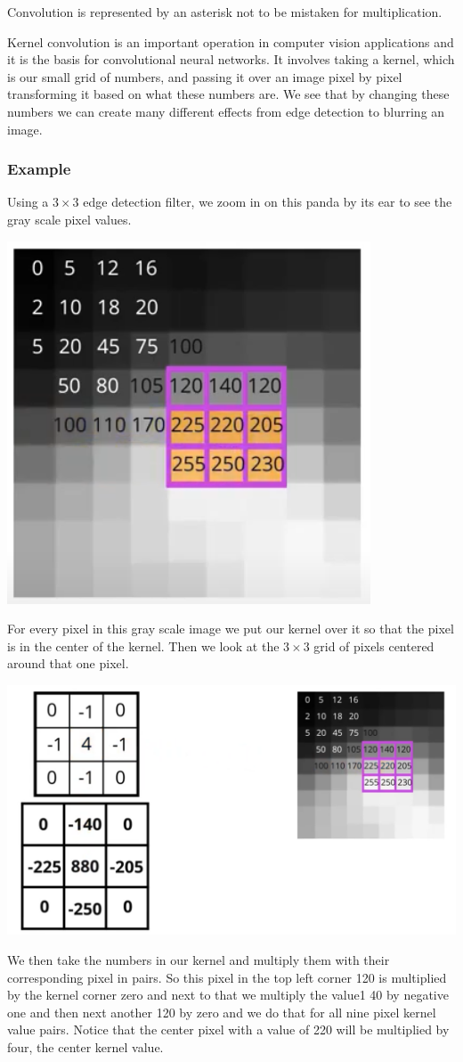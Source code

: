 Convolution is represented by an asterisk not to be mistaken for multiplication. \newline

Kernel convolution is an important operation in computer vision applications and it is the basis for convolutional neural networks. It involves taking a kernel, which is our small grid of numbers, and passing it over an image pixel by pixel transforming it based on what these numbers are. We see that by changing these numbers we can create many different effects from edge detection to blurring an image.

\subsubsection{Example}
Using a \(3 \times 3\) edge detection filter, we zoom in on this panda by its ear to see the gray scale pixel values.

\includegraphics[width=0.25\linewidth]{img//cnn//concepts/image6.png}
\label{fig:pandaEar}

 For every pixel in this gray scale image we put our kernel over it so that the pixel is in the center of the kernel. Then we look at the \(3 \times 3\) grid of pixels centered around that one pixel. 

\includegraphics[width=1\linewidth]{img//cnn/image7.png}
 
 We then take the numbers in our kernel and multiply them with their corresponding pixel in pairs. So this pixel in the top left corner 120 is multiplied by the kernel corner zero and next to that we multiply the value1 40 by negative one and then next another 120 by zero and we do that for all nine pixel kernel value pairs. Notice that the center pixel with a value of 220 will be multiplied by four, the center kernel value. \newline
 
